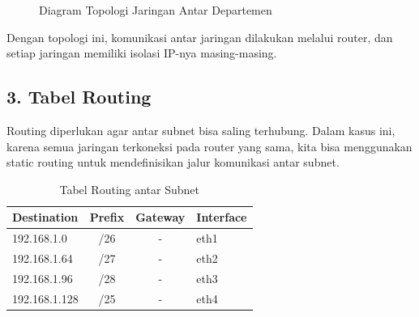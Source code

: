 \documentclass[12pt,a4paper]{article}
\begin{document}
\begin{figure}[H]
\centering
{}
\caption{Diagram Topologi Jaringan Antar Departemen}
\end{figure}


Dengan topologi ini, komunikasi antar jaringan dilakukan melalui router, dan setiap jaringan memiliki isolasi IP-nya masing-masing.

\subsection*{3. Tabel Routing}

Routing diperlukan agar antar subnet bisa saling terhubung. Dalam kasus ini, karena semua jaringan terkoneksi pada router yang sama, kita bisa menggunakan static routing untuk mendefinisikan jalur komunikasi antar subnet.

\begin{table}[H]
\centering
\begin{tabular}{|l|c|c|l|}
\hline
\textbf{Destination} & \textbf{Prefix} & \textbf{Gateway} & \textbf{Interface} \\
\hline
192.168.1.0 & /26 & - & eth1 \\
192.168.1.64 & /27 & - & eth2 \\
192.168.1.96 & /28 & - & eth3 \\
192.168.1.128 & /25 & - & eth4 \\
\hline
\end{tabular}
\caption{Tabel Routing antar Subnet}
\end{table}
\end{document}
